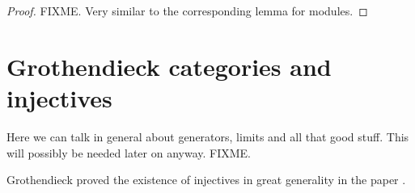 \begin{proof}
FIXME. Very similar to the corresponding lemma for modules.
\end{proof}

\section{Grothendieck categories and injectives}

\noindent
Here we can talk in general about generators, limits and
all that good stuff. This will possibly be needed later on
anyway. FIXME.

\medskip\noindent
Grothendieck proved the existence of injectives in great generality 
in the paper \cite{Tohoku}. 









